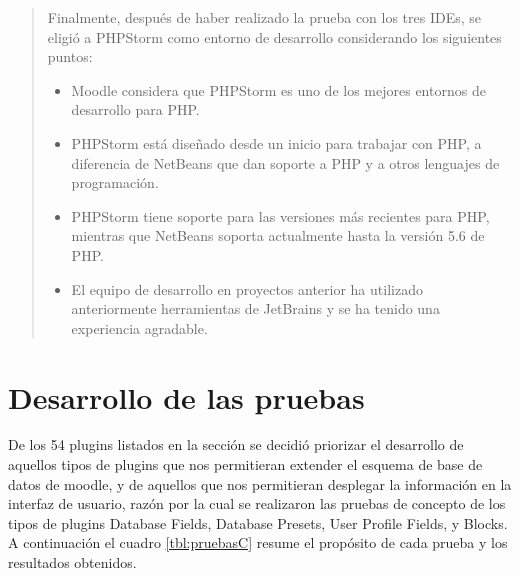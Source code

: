 \begin{quote}
Finalmente, después de haber realizado la prueba con los  tres IDEs, se eligió a PHPStorm como entorno de desarrollo considerando los siguientes puntos:
    \begin{itemize}
    \item Moodle considera que PHPStorm es uno de los mejores entornos de desarrollo para PHP.
    \item PHPStorm está diseñado desde un inicio para trabajar con PHP, a diferencia de NetBeans que dan soporte a PHP y a otros lenguajes de programación.
    \item PHPStorm tiene soporte para las versiones más recientes para PHP, mientras que NetBeans soporta actualmente hasta la versión 5.6 de PHP.
    \item El equipo de desarrollo en proyectos anterior ha utilizado anteriormente herramientas de JetBrains y se ha tenido una experiencia agradable. %
    \end{itemize}
\end{quote}

\section{Desarrollo de las pruebas}

    De los 54 plugins listados en la sección  se decidió priorizar el desarrollo de aquellos tipos de plugins que nos permitieran extender el esquema de base de datos de moodle, y de aquellos que nos permitieran desplegar la información en la interfaz de usuario, razón por la cual se realizaron las pruebas de concepto de los tipos de plugins Database Fields, Database Presets, User Profile Fields, y Blocks.\\

    \noindent A continuación el cuadro \ref{tbl:pruebasC} resume el propósito de cada prueba y los resultados obtenidos.

